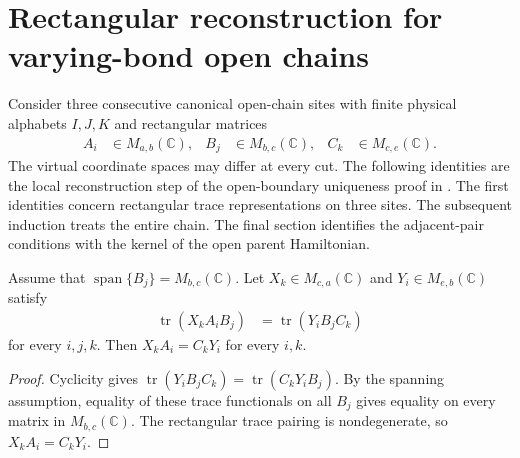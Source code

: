 \section{Rectangular reconstruction for varying-bond open chains}
\label{sec:parent_varying_obc_reconstruction}

Consider three consecutive canonical open-chain sites with finite
physical alphabets $I,J,K$ and rectangular matrices
\begin{align}
    A_i & \in M_{a,b}(\mathbb C), &
    B_j & \in M_{b,c}(\mathbb C), &
    C_k & \in M_{c,e}(\mathbb C).
\end{align}
The virtual coordinate spaces may differ at every cut. The following
identities are the local reconstruction step of the open-boundary
uniqueness proof in \cite[Theorem~9, lines~1212--1237]{PerezGarcia2007Matrix}.
The first identities concern rectangular trace representations on three sites.
The subsequent induction treats the entire chain. The final section identifies
the adjacent-pair conditions with the kernel of the open parent Hamiltonian.

\begin{lemma}
    \label{lem:varying_obc_overlap_boundary_products}
    \leanok
    Assume that $\operatorname{span}\{B_j\}=M_{b,c}(\mathbb C)$.
    Let $X_k\in M_{c,a}(\mathbb C)$ and $Y_i\in M_{e,b}(\mathbb C)$ satisfy
    \begin{align}
        \operatorname{tr}(X_kA_iB_j) & =\operatorname{tr}(Y_iB_jC_k)
    \end{align}
    for every $i,j,k$. Then $X_kA_i=C_kY_i$ for every $i,k$.
\end{lemma}
\begin{proof}\leanok
    Cyclicity gives
    $\operatorname{tr}(Y_iB_jC_k)=\operatorname{tr}(C_kY_iB_j)$.
    By the spanning assumption, equality of these trace functionals on
    all $B_j$ gives equality on every matrix in $M_{b,c}(\mathbb C)$.
    The rectangular trace pairing is nondegenerate, so $X_kA_i=C_kY_i$.
\end{proof}

